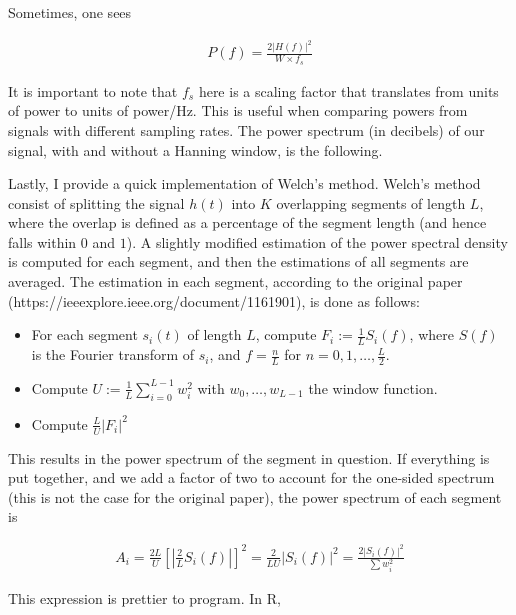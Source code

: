 \documentclass[a4paper, 12pt]{article}
\begin{document}
Sometimes, one sees 

\begin{align*}
    P(f) = \frac{2|H(f)|^2}{W \times f_s}
\end{align*}

It is important to note that $f_s$ here is a scaling factor that translates
from units of power to units of power/Hz. This is useful when comparing 
powers from signals with different sampling rates. The power spectrum (in
decibels) of our signal, with and without a Hanning window, is the following.



Lastly, I provide a quick implementation of Welch's method. Welch's method consist 
of splitting the signal $h(t)$ into $K$ overlapping segments of length $L$, where 
the overlap is defined as a percentage of the segment length (and hence falls 
within $0$ and $1$). A slightly modified estimation of the power spectral density 
is computed for each segment, and then the estimations of all segments are 
averaged. The estimation in each segment, according to the original paper
(https://ieeexplore.ieee.org/document/1161901), is done as follows:

\begin{itemize}
    \item For each segment $s_i(t)$ of length $L$, compute $F_i := \frac{1}{L}S_i(f)$, where $S(f)$ is the 
        Fourier transform of $s_i$, and $f = \frac{n}{L}$ for $n = 0, 1, \ldots, \frac{L}{2}$.
    \item Compute $U := \frac{1}{L} \sum_{i=0}^{L-1} w_i^2$ with $w_0, \ldots, w_{L-1}$ the window function.
    \item Compute $\frac{L}{U} |F_i|^2$
\end{itemize}

This results in the power spectrum of the segment in question. If everything is put together, and 
we add a factor of two to account for the one-sided spectrum (this is not the case for the 
original paper), the
power spectrum of each segment is 

\begin{align*}
    A_i = \frac{2L}{U} \left[ |\frac{2}{L} S_i(f)| \right]^2 = \frac{2}{LU}|S_i(f)|^2 = \frac{2|S_i(f)|^2}{\sum w_i^2}
\end{align*}

This expression is prettier to program. In R,
\end{document}
